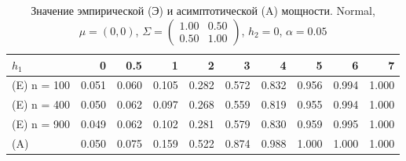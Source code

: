 \begin{table}[ht]
\centering
\caption{Значение эмпирической (Э) и асимптотической (A) мощности. Normal, $\mu = (0, 0)$, $\Sigma = \begin{pmatrix}
1.00 & 0.50 \\
0.50 & 1.00
\end{pmatrix}$, $h_2 = 0$, $\alpha = 0.05$} 
\label{tab:power_table}
\begin{tabular}{lrrrrrrrrr}
  \hline
$h_{1}$ & 0 & 0.5 & 1 & 2 & 3 & 4 & 5 & 6 & 7 \\ 
  \hline
(E) n = 100 & 0.051 & 0.060 & 0.105 & 0.282 & 0.572 & 0.832 & 0.956 & 0.994 & 1.000 \\ 
  (E) n = 400 & 0.050 & 0.062 & 0.097 & 0.268 & 0.559 & 0.819 & 0.955 & 0.994 & 1.000 \\ 
  (E) n = 900 & 0.049 & 0.062 & 0.102 & 0.281 & 0.579 & 0.830 & 0.959 & 0.995 & 1.000 \\ 
  (A)         & 0.050 & 0.075 & 0.159 & 0.522 & 0.874 & 0.988 & 1.000 & 1.000 & 1.000 \\
   \hline
\end{tabular}
\end{table}
